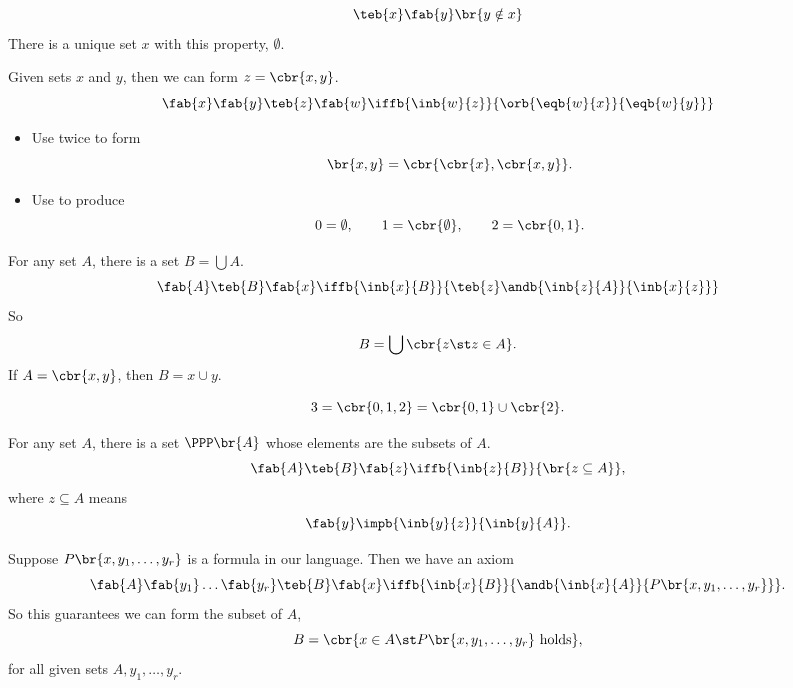 \begin{axiom**}
$$ \teb{x}\fab{y}\br{y \notin x} $$
There is a unique set $ x $ with this property, $ \emptyset $.
\end{axiom**}


\begin{axiom**}
Given sets $ x $ and $ y $, then we can form $ z = \cbr{x, y} $.
$$ \fab{x}\fab{y}\teb{z}\fab{w}\iffb{\inb{w}{z}}{\orb{\eqb{w}{x}}{\eqb{w}{y}}} $$
\end{axiom**}

\begin{remark*}
\hfill
\begin{itemize}
\item Use twice to form
$$ \br{x, y} = \cbr{\cbr{x}, \cbr{x, y}}. $$
\item Use to produce
$$ 0 = \emptyset, \qquad 1 = \cbr{\emptyset}, \qquad 2 = \cbr{0, 1}. $$
\end{itemize}
\end{remark*}

\pagebreak

\begin{axiom**}
For any set $ A $, there is a set $ B = \bigcup A $.
$$ \fab{A}\teb{B}\fab{x}\iffb{\inb{x}{B}}{\teb{z}\andb{\inb{z}{A}}{\inb{x}{z}}} $$
So
$$ B = \bigcup \cbr{z \st z \in A}. $$
If $ A = \cbr{x, y} $, then $ B = x \cup y $.
\end{axiom**}

\begin{example*}
$$ 3 = \cbr{0, 1, 2} = \cbr{0, 1} \cup \cbr{2}. $$
\end{example*}

\begin{axiom**}
For any set $ A $, there is a set $ \PPP\br{A} $ whose elements are the subsets of $ A $.
$$ \fab{A}\teb{B}\fab{z}\iffb{\inb{z}{B}}{\br{z \subseteq A}}, $$
where $ z \subseteq A $ means
$$ \fab{y}\impb{\inb{y}{z}}{\inb{y}{A}}. $$
\end{axiom**}

\begin{axiom**}
Suppose $ P\br{x, y_1, \dots, y_r} $ is a formula in our language. Then we have an axiom
$$ \fab{A}\fab{y_1} \dots \fab{y_r}\teb{B}\fab{x}\iffb{\inb{x}{B}}{\andb{\inb{x}{A}}{P\br{x, y_1, \dots, y_r}}}. $$
So this guarantees we can form the subset of $ A $,
$$ B = \cbr{x \in A \st P\br{x, y_1, \dots, y_r} \ \text{holds}}, $$
for all given sets $ A, y_1, \dots, y_r $.
\end{axiom**}


